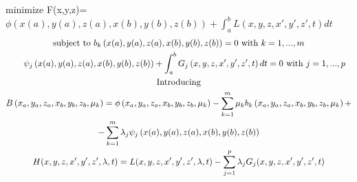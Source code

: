 \documentclass[a4paper,12pt]{article}
\begin{document}
	minimize F(x,y,z)=$\phi \left( x(a),y(a),z(a),x(b),y(b),z(b) \right)+\int_a^b L(x,y,z,x',y',z',t)dt$
	\begin{gather}
		\text{subject to} \  b_k \left( x(a),y(a),z(a),x(b),y(b),z(b) \right) = 0 \text{ with } k=1,...,m \notag\\
		\ \ \ \ \psi_j\left( x(a),y(a),z(a),x(b),y(b),z(b) \right)+\int_a^b G_j \left( x,y,z,x',y',z',t \right)dt  = 0 \text{ with } j=1,...,p \\
		\text{Introducing} \notag \\
		B\left( x_a,y_a,z_a,x_b,y_b,z_b,\mu_k \right) = \phi \left( x_a,y_a,z_a,x_b,y_b,z_b,\mu_k \right) - \sum_{k=1}^{m} \mu_k b_k\left( x_a,y_a,z_a,x_b,y_b,z_b,\mu_k \right)+ \notag\\
		-\sum_{k=1}^{m} \lambda_j \psi_j\left( x(a),y(a),z(a),x(b),y(b),z(b) \right)\\
		H(x,y,z,x',y',z',\lambda, t)=L(x,y,z,x',y',z',\lambda, t)-\sum_{j=1}^{p}\lambda_j G_j(x,y,z,x',y',z',t)
	\end{gather}
\end{document}
